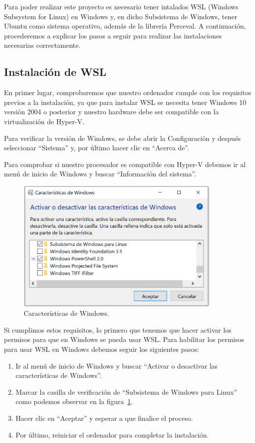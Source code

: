 \documentclass[a4paper, 12pt]{book}
\begin{document}
Para poder realizar este proyecto es necesario tener intalados WSL (Windows Subsystem for Linux) en Windows y, en dicho Subsistema de Windows, tener Ubuntu como sistema operativo, además de la librería Perceval. 
A continuación, procederemos a explicar los pasos a seguir para realizar las instalaciones necesarias correctamente.

\subsection{Instalación de WSL} %
\label{sec:instalación de WSL}

En primer lugar, comprobaremos que nuestro ordenador cumple con los requisitos previos a la instalación, ya que para instalar WSL se necesita tener Windows 10 versión 2004 o posterior y nuestro hardware debe ser compatible con la virtualización de Hyper-V. 


Para verificar la versión de Windows, se debe abrir la Configuración y después seleccionar ``Sistema'' y, por último hacer clic en ``Acerca de''.


Para comprobar si nuestro procesador es compatible con Hyper-V debemos ir al menú de inicio de Windows y buscar ``Información del sistema''.

\begin{figure}
  \centering
  \includegraphics[width=10cm, keepaspectratio]{img/CaracteristicasWindows.PNG}
  \caption{Características de Windows.}\label{fig:CaracteristicasWindows}
\end{figure}


Si cumplimos estos requisitos, lo primero que tenemos que hacer activar los permisos para que en Windows se pueda usar WSL.
Para habilitar los permisos para usar WSL en Windows debemos seguir los siguientes pasos:
\begin{enumerate}
  \item Ir al menú de inicio de Windows y buscar ``Activar o desactivar las características de Windows''.
  \item Marcar la casilla de verificación de ``Subsistema de Windows para Linux'' como podemos observar en la figura~\ref{fig:CaracteristicasWindows}.
  \item Hacer clic en ``Aceptar'' y esperar a que finalice el proceso. 
  \item Por último, reiniciar el ordenador para completar la instalación.
\end{enumerate} 
  
\end{document}
